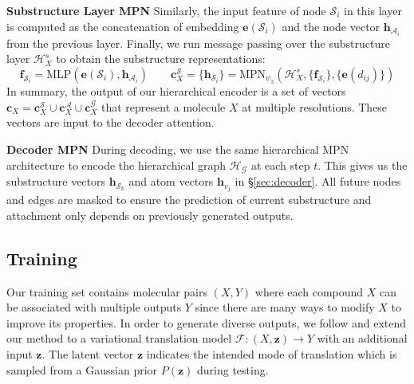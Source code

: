 \documentclass{article} \usepackage{iclr2020_conference,times}
\newcommand{\graph}{\mathcal{G}}
\newcommand{\MLP}{\mathrm{MLP}}
\newcommand{\MPN}{\mathrm{MPN}}
\newcommand{\set}[1]{\{ #1 \}}
\def\vc{{\bm{c}}}
\def\ve{{\bm{e}}}
\def\vf{{\bm{f}}}
\def\vh{{\bm{h}}}
\def\vz{{\bm{z}}}
\def\gA{{\mathcal{A}}}
\def\gF{{\mathcal{F}}}
\def\gH{{\mathcal{H}}}
\def\gS{{\mathcal{S}}}
\begin{document}
\textbf{Substructure Layer MPN } Similarly, the input feature of node $\gS_i$ in this layer is computed as the concatenation of embedding $\ve(\gS_i)$ and the node vector $\vh_{\gA_i}$ from the previous layer. Finally, we run message passing over the substructure layer $\gH_X^s$ to obtain the substructure representations:
\begin{equation}
\vf_{\gS_i} = \MLP\left( \ve(\gS_i), \vh_{\gA_i} \right) \qquad 
\vc_X^\gS = \set{\vh_{\gS_i}} = \MPN_{\psi_3}\left(\gH_X^s, \set{\vf_{\gS_i}}, \set{\ve(d_{ij})} \right)
\end{equation}
In summary, the output of our hierarchical encoder is a set of vectors $\vc_X = \vc_X^\gS \cup \vc_X^\gA \cup \vc_X^\graph$ that represent a molecule $X$ at multiple resolutions. These vectors are input to the decoder attention.

\textbf{Decoder MPN } During decoding, we use the same hierarchical MPN architecture to encode the hierarchical graph $\gH_\graph$ at each step $t$. This gives us the substructure vectors $\vh_{\gS_k}$ and atom vectors $\vh_{v_j}$ in \S\ref{sec:decoder}. All future nodes and edges are masked to ensure the prediction of current substructure and attachment only depends on previously generated outputs.

\subsection{Training}
\label{sec:training}

Our training set contains molecular pairs $(X,Y)$ where each compound $X$ can be associated with multiple outputs $Y$ since there are many ways to modify $X$ to improve its properties. In order to generate diverse outputs, we follow \citet{jin2018learning} and extend our method to a variational translation model $\gF: (X, \vz) \rightarrow Y$ with an additional input $\vz$. The latent vector $\vz$ indicates the intended mode of translation which is sampled from a Gaussian prior $P(\vz)$ during testing.
\end{document}

